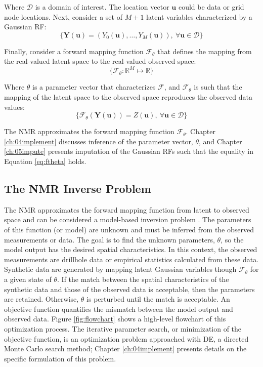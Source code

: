 Where $\mathcal{D}$ is a domain of interest. The location vector $\mathbf{u}$ could be data or grid node locations. Next, consider a set of $M+1$ latent variables characterized by a Gaussian \gls{RF}:
\begin{equation}
    \{\mathbf{Y}(\mathbf{u}) = (Y_{0}(\mathbf{u}), \dots, Y_{M}(\mathbf{u})), \ \forall \mathbf{u} \in \mathcal{D}\}
    \label{eq:gpool}
\end{equation}

Finally, consider a forward mapping function $\mathcal{F}_{\theta}$ that defines the mapping from the real-valued latent space to the real-valued observed space:
\begin{equation}
    \{\mathcal{F}_{\theta}: \mathbb{R}^{M} \mapsto \mathbb{R} \}
    \label{eq:fmap}
\end{equation}

Where $\theta$ is a parameter vector that characterizes $\mathcal{F}$, and $\mathcal{F}_{\theta}$ is such that the mapping of the latent space to the observed space reproduces the observed data values:
\begin{equation}
    \{\mathcal{F}_{\theta}(\mathbf{Y}(\mathbf{u})) = Z(\mathbf{u}), \ \forall \mathbf{u} \in \mathcal{D}\}
    \label{eq:ftheta}
\end{equation}

The \gls{NMR} approximates the forward mapping function $\mathcal{F}_{\theta}$. Chapter \ref{ch:04implement} discusses inference of the parameter vector, $\theta$, and Chapter \ref{ch:05impute} presents imputation of the Gaussian \glspl{RF} such that the equality in Equation \ref{eq:ftheta} holds.

\subsection{The NMR Inverse Problem}
\label{subsec:03nmrinverse}

The \gls{NMR} approximates the forward mapping function from latent to observed space and can be considered a model-based inversion problem \citep{sen2013global}. The parameters of this function (or model) are unknown and must be inferred from the observed measurements or data. The goal is to find the unknown parameters, $\theta$, so the model output has the desired spatial characteristics. In this context, the observed measurements are drillhole data or empirical statistics calculated from these data. Synthetic data are generated by mapping latent Gaussian variables though $\mathcal{F}_{\theta}$ for a given state of $\theta$. If the match between the spatial characteristics of the synthetic data and those of the observed data is acceptable, then the parameters are retained. Otherwise, $\theta$ is perturbed until the match is acceptable. An objective function quantifies the mismatch between the model output and observed data. Figure \ref{fig:flowchart} shows a high-level flowchart of this optimization process. The iterative parameter search, or minimization of the objective function, is an optimization problem approached with \gls{DE}, a directed Monte Carlo search method; Chapter \ref{ch:04implement} presents details on the specific formulation of this problem.

